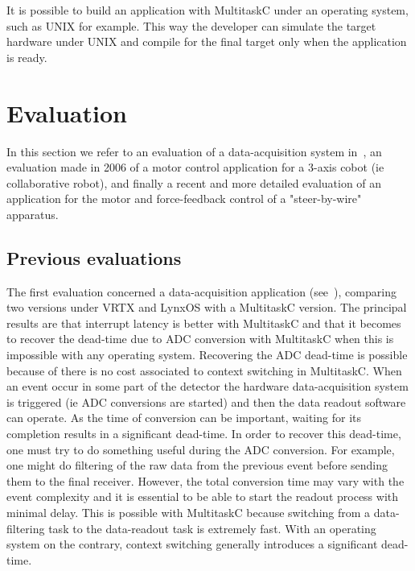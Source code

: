 \documentclass[10pt]{report}
\begin{document}
It is possible to build an application with MultitaskC under an operating system, such as UNIX for example. This way 
the developer can simulate the target hardware under UNIX and compile for the final target only when the application is ready.

\chapter{Evaluation}
\label{sec:evaluation}

In this section we refer to an evaluation of a data-acquisition system in~\cite{Delchini:95}, 
an evaluation made in 2006 of a motor control application for a 3-axis cobot (ie collaborative robot), and finally a 
recent and more detailed evaluation of an application for the motor and force-feedback control of a "steer-by-wire" apparatus.

\section{Previous evaluations}

The first evaluation concerned a data-acquisition application (see~\cite{Delchini:95}), comparing two versions under VRTX and LynxOS 
with a MultitaskC version. The principal results are that interrupt latency is better with MultitaskC and that it becomes 
to recover the dead-time due to ADC conversion with MultitaskC when this is impossible with any operating system. 
Recovering the ADC dead-time is possible because of there is no cost associated to context switching in MultitaskC. 
When an event occur in some part of the detector the hardware data-acquisition system is triggered (ie ADC conversions are
started) and then the data readout software can operate. As the time of conversion can be important, waiting for its completion 
results in a significant dead-time. In order to recover this dead-time, one must try to do something useful during the ADC 
conversion. For example, one might do filtering of the raw data from the previous event before sending them to the final receiver. 
However, the total conversion time may vary with the event complexity and it is essential to be able to start the readout process 
with minimal delay. This is possible with MultitaskC because switching from a data-filtering task to the data-readout task is 
extremely fast. With an operating system on the contrary, context switching generally introduces a significant dead-time.
\end{document}
